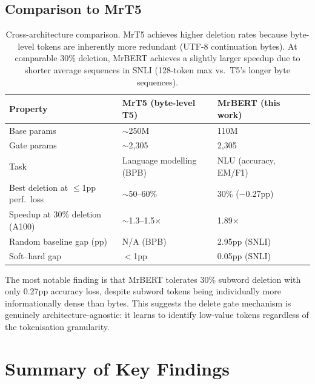 \subsection{Comparison to MrT5}
\label{sec:comparison-mrt5}

\begin{table}[h]
\centering
\small
\begin{tabular}{@{}llll@{}}
\toprule
\textbf{Property} & \textbf{MrT5 (byte-level T5)} & \textbf{MrBERT (this work)} \\
\midrule
Base params                             & $\sim$250M              & 110M \\
Gate params                             & $\sim$2,305             & 2,305 \\
Task                                    & Language modelling (BPB) & NLU (accuracy, EM/F1) \\
Best deletion at $\leq$1pp perf.\ loss  & $\sim$50--60\%          & 30\% ($-$0.27pp) \\
Speedup at 30\% deletion (A100)         & $\sim$1.3--1.5$\times$  & 1.89$\times$ \\
Random baseline gap (pp)                & N/A (BPB)               & 2.95pp (SNLI) \\
Soft--hard gap                          & $<$1pp                  & 0.05pp (SNLI) \\
\bottomrule
\end{tabular}
\caption{Cross-architecture comparison. MrT5 achieves higher deletion rates because byte-level tokens are inherently more redundant (UTF-8 continuation bytes). At comparable 30\% deletion, MrBERT achieves a slightly larger speedup due to shorter average sequences in SNLI (128-token max vs.\ T5's longer byte sequences).}
\label{tab:comparison-mrt5}
\end{table}

The most notable finding is that MrBERT tolerates 30\% subword deletion with only 0.27pp accuracy loss, despite subword tokens being individually more informationally dense than bytes.
This suggests the delete gate mechanism is genuinely architecture-agnostic: it learns to identify low-value tokens regardless of the tokenisation granularity.


\section{Summary of Key Findings}
\label{sec:key-findings}

